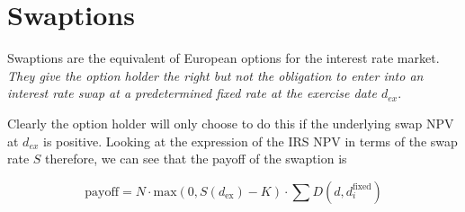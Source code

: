 %
%
%

\section{Swaptions}
\label{interest-rate-swaptions}

Swaptions are the equivalent of European options for the interest rate market. \emph{They give the option holder the right but not the obligation to enter into an interest rate swap at a predetermined fixed rate at the exercise date $d_{ex}$}.

Clearly the option holder will only choose to do this if the underlying swap NPV at $d_{ex}$ is positive. Looking at the expression of the IRS NPV in terms of the swap rate $S$ therefore, we can see that the payoff of the swaption is

\begin{equation}
\mathrm{payoff} = N\cdot \mathrm{max}(0, S(d_{\mathrm{ex}}) - K)\cdot\sum D(d, d_i^{\mathrm{fixed}})
\label{eq:swaption_payoff}
\end{equation}



